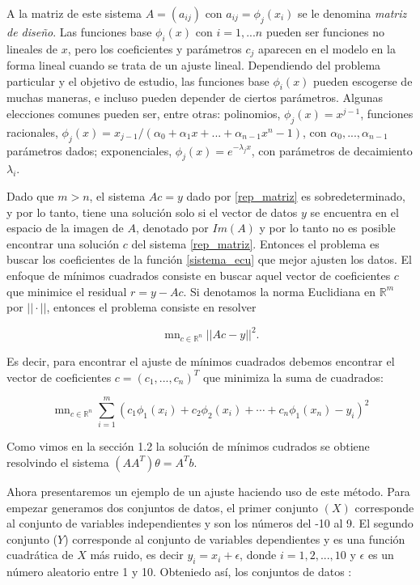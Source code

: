 A la matriz de este sistema $A = (a_{ij})$ con $a_{ij} = \phi_{j}(x_{i})$ se le denomina \textit{matriz de diseño}. Las funciones base $\phi_{i}(x)$ con $i = 1, ...n$ pueden ser funciones no lineales de $x$, pero los coeficientes y parámetros $c_{j}$ aparecen en el modelo en la forma lineal cuando se trata de un ajuste lineal. Dependiendo del problema particular y el objetivo de estudio, las funciones base $\phi_{i}(x)$ pueden escogerse de muchas maneras, e incluso pueden depender de ciertos parámetros. Algunas elecciones comunes pueden ser, entre otras: polinomios, $\phi_{j}(x) = x^{j-1}$, funciones racionales, $\phi_{j}(x) = x_{j-1}/(\alpha_{0} + \alpha_{1}x + ... + \alpha_{n-1}x^n-1)$, con $\alpha_{0}, ..., \alpha_{n-1}$ parámetros dados; exponenciales, $\phi_{j}(x) = e^{-\lambda_{j}x}$, con parámetros de decaimiento $\lambda_{i}$.

Dado que $m>n$, el sistema $Ac = y$ dado por \ref{rep_matriz} es sobredeterminado, y por lo tanto, tiene una solución solo si el vector de datos $y$ se encuentra en el espacio de la imagen de $A$, denotado por $Im(A)$ y por lo tanto no es posible encontrar una solución $c$ del sistema \ref{rep_matriz}. Entonces el problema es buscar los coeficientes de la función \ref{sistema_ecu} que mejor ajusten los datos. El enfoque de mínimos cuadrados consiste en buscar aquel vector de coeficientes $c$ que minimice el residual $r = y - Ac$. Si denotamos la norma Euclidiana en $\mathbb{R}^{m}$ por $||\cdot||$, entonces el problema consiste en resolver 

\begin{equation}
\mathop{m\acute{i}n}_{c \in \mathbb{R}^{n}} ||Ac -y||^{2}.
\end{equation} 

Es decir, para encontrar el ajuste de mínimos cuadrados debemos encontrar el vector de coeficientes $c = (c_{1}, ..., c_{n})^{T}$ que minimiza la suma de cuadrados: 

\begin{equation}
\mathop{m\acute{i}n}_{c \in \mathbb{R}^{n}} \sum_{i=1}^{m}(c_{1}\phi_{1}(x_{i}) + c_{2}\phi_{2}(x_{i}) + \cdots + c_{n}\phi_{1}(x_{n})- y_{i})^{2}
\end{equation}

Como vimos en la sección 1.2 la solución de mínimos cudrados se obtiene resolvindo el sistema $(AA^{T})\theta = A^{T}b$.

Ahora presentaremos un ejemplo de un ajuste haciendo uso de este método. Para empezar generamos dos conjuntos de datos, el primer conjunto $(X)$ corresponde al conjunto de variables independientes y son los números del -10 al 9. El segundo conjunto ($Y$) corresponde al conjunto de variables dependientes y es una función cuadrática de $X$ más ruido, es decir $y_{i} = x_{i} + \epsilon$, donde $i = 1, 2,..., 10$ y $\epsilon$ es un número aleatorio entre 1 y 10. Obteniedo así, los conjuntos de datos : 

